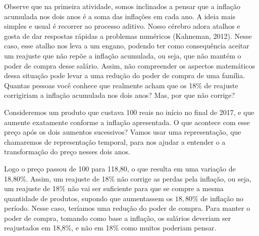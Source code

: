 
Observe que na primeira atividade, somos inclinados a pensar que a inflação acumulada nos dois anos é a soma das inflações em cada ano. A ideia mais simples e usual é recorrer ao processo aditivo. Nosso cérebro adora atalhos e gosta de dar respostas rápidas a problemas numéricos (Kahneman, 2012). Nesse caso, esse atalho nos leva a um engano, podendo ter como consequência aceitar um reajuste que não repõe a inflação acumulada, ou seja, que não mantém o poder de compra desse salário. Assim, não compreender os aspectos matemáticos dessa situação pode levar a uma redução do poder de compra de uma família. Quantas pessoas você conhece que realmente acham que os 18\% de reajuste corrigiriam a inflação acumulada nos dois anos? Mas, por que não corrige?

Consideremos um produto que custava 100 reais no início no final de 2017, e que aumente exatamente conforme a inflação apresentada. O que acontece com esse preço após os dois aumentos sucessivos? Vamos usar uma representação, que chamaremos de representação temporal, para nos ajudar a entender o a transformação do preço nesses dois anos.  

\begin{figure}[H]
\centering


\end{figure}

Logo o preço passou de 100 para 118,80, o que resulta em uma variação de 18,80\%. Assim, um reajuste de 18\% não corrige as perdas pela inflação, ou seja, um reajuste de 18\% não vai ser suficiente para que se compre a mesma quantidade de produtos, supondo que aumentassem os $18{,}80$\% de inflação no período. Nesse caso, teríamos uma redução do poder de compra. Para manter o poder de compra, tomando como base a inflação, os salários deveriam ser reajustados em 18,8\%, e não em 18\% como muitos poderiam pensar. 

